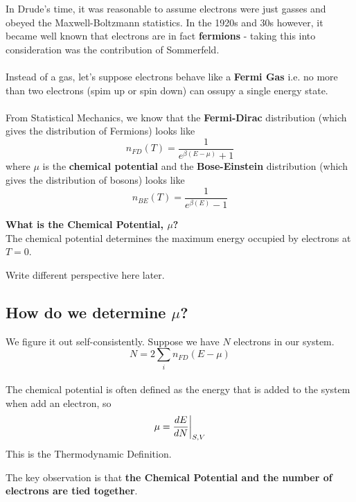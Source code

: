 \documentclass[11pt]{article}
\begin{document}
In Drude's time, it was reasonable to assume electrons were just gasses and obeyed the Maxwell-Boltzmann statistics. In the 1920s and 30s however, it became well known that electrons are in fact \textbf{fermions} - taking this into consideration was the contribution of Sommerfeld.
\\
\\
Instead of a gas, let's suppose electrons behave like a \textbf{Fermi Gas} i.e. no more than two electrons (spim up or spin down) can ossupy a single energy state.
\\
\\
From Statistical Mechanics, we know that the \textbf{Fermi-Dirac} distribution (which gives the distribution of Fermions) looks like $$ n_{FD}(T) = \frac{1}{e^{\beta(E-\mu)} + 1} $$ where $\mu$ is the \textbf{chemical potential} and the \textbf{Bose-Einstein} distribution (which gives the distribution of bosons) looks like $$ n_{BE}(T) = \frac{1}{e^{\beta(E)} - 1} $$

\begin{bluebox}
  \textbf{What is the Chemical Potential, $\mu$?}
  \\
  The chemical potential determines the maximum energy occupied by electrons at $T = 0$.
  \begin{note}
    {Write different perspective here later.}
  \end{note} 
\end{bluebox}

\subsection*{How do we determine $\mu$?}
We figure it out self-consistently. Suppose we have $N$ electrons in our system. $$ N = 2 \sum_i n_{FD}(E - \mu) $$
\\
The chemical potential is often defined as the energy that is added to the system when add an electron, so $$\mu = \restr{\frac{dE}{dN} }{S, V} $$ This is the Thermodynamic Definition.

The key observation is that \textbf{the Chemical Potential and the number of electrons are tied together}.
\end{document}
